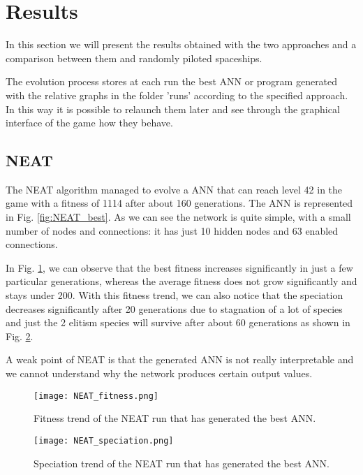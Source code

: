 
\section{Results}
In this section we will present the results obtained with the two approaches and a
comparison between them and randomly piloted spaceships.

The evolution process stores at each run the best ANN or program generated with the
relative graphs in the folder 'runs' according to the specified approach. In this way it is
possible to relaunch them later and see through the graphical interface of the game how
they behave.

\subsection{NEAT}
The NEAT algorithm managed to evolve a ANN that can reach level 42 in the game with a
fitness of 1114 after about 160 generations. The ANN is represented in Fig. \ref{fig:NEAT_best}. As we can
see the network is quite simple, with a small number of nodes and connections: it has just 10
hidden nodes and 63 enabled connections.


In Fig. \ref{fig:NEAT_fitness}, we can observe that the best fitness increases significantly in just a few particular
generations, whereas the average fitness does not grow significantly and stays under 200.
With this fitness trend, we can also notice that the speciation decreases significantly after 20
generations due to stagnation of a lot of species and just the 2 elitism species will survive
after about 60 generations as shown in Fig. \ref{fig:NEAT_speciation}.

A weak point of NEAT is that the generated ANN is not really interpretable and we cannot
understand why the network produces certain output values.

\begin{figure}[ht]
\centerline{\texttt{[image: NEAT\_fitness.png]}}
\caption{Fitness trend of the NEAT run that has generated the best ANN.}
\label{fig:NEAT_fitness}
\end{figure}


\begin{figure}[ht]
\centerline{\texttt{[image: NEAT\_speciation.png]}}
\caption{Speciation trend of the NEAT run that has generated the best ANN.}
\label{fig:NEAT_speciation}
\end{figure}



